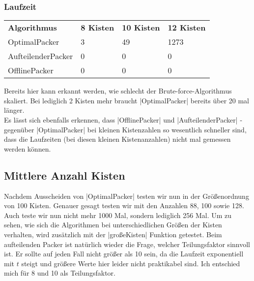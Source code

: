 \subsubsection*{Laufzeit}
\begin{tabular}{llll}
\textbf{Algorithmus} 	& \textbf{8 Kisten} 	& \textbf{10 Kisten} 	& \textbf{12 Kisten} 	\\
 OptimalPacker       	& 3               	& 49              	& 1273               	\\
 AufteilenderPacker  	& 0		 	& 0			& 0			\\
 OfflinePacker		& 0			& 0			& 0			\\
\end{tabular}
 Bereits hier kann erkannt werden, wie schlecht der Brute-force-Algorithmus skaliert.
 Bei lediglich 2 Kisten mehr braucht |OptimalPacker| bereits über 20 mal länger. \\
 Es lässt sich ebenfalls erkennen, dass |OfflinePacker| und |AufteilenderPacker| - gegenüber |OptimalPacker|
  bei kleinen Kistenzahlen so wesentlich schneller sind, dass die Laufzeiten (bei diesen kleinen Kistenanzahlen) nicht mal gemessen werden können.

\subsection{Mittlere Anzahl Kisten}
 Nachdem Ausscheiden von |OptimalPacker| testen wir nun in der Größenordnung von 100 Kisten.
 Genauer gesagt testen wir mit den Anzahlen 88, 100 sowie 128.
 Auch teste wir nun nicht mehr 1000 Mal, sondern lediglich 256 Mal.
 Um zu sehen, wie sich die Algorithmen bei unterschiedlichen Größen der Kisten verhalten, wird zusätzlich mit der |großeKisten| Funktion getestet.
 Beim aufteilenden Packer ist natürlich wieder die Frage, welcher Teilungsfaktor sinnvoll ist.
 Er sollte auf jeden Fall nicht größer als 10 sein, da die Laufzeit exponentiell mit $t$ steigt und größere Werte hier leider nicht praktikabel sind.
 Ich entschied mich für 8 und 10 als Teilungsfaktor.

